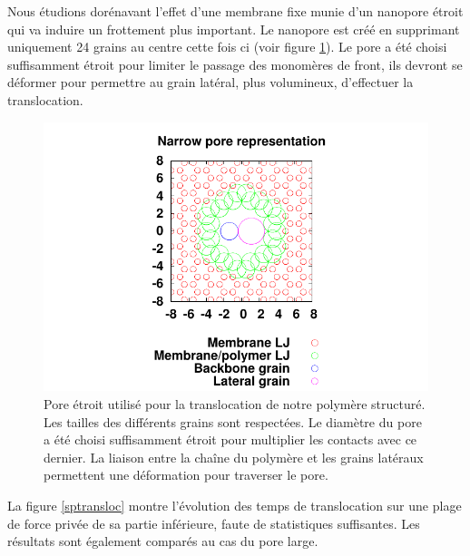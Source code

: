 Nous étudions dorénavant l'effet d'une membrane fixe munie d'un nanopore étroit qui va induire un frottement plus important. Le nanopore est créé en supprimant uniquement 24 grains au centre cette fois ci (voir figure \ref{porethin}). Le pore a été choisi suffisamment étroit pour limiter le passage des monomères de front, ils devront se déformer pour permettre au grain latéral, plus volumineux, d'effectuer la translocation.

\begin{figure}[H]
\begin{center}
\includegraphics[width=1\textwidth]{thinpore.pdf}


\caption[Polymère structuré et pore étroit]{Pore étroit utilisé pour la translocation de notre polymère structuré. Les tailles des différents grains sont respectées. Le diamètre du pore a été choisi suffisamment étroit pour multiplier les contacts avec ce dernier. La liaison entre la chaîne du polymère et les grains latéraux permettent une déformation pour traverser le pore.}
\label{porethin}

\end{center}
\end{figure}

La figure \ref{sptransloc} montre l'évolution des temps de translocation sur une plage de force privée de sa partie inférieure, faute de statistiques suffisantes. Les résultats sont également comparés au cas du pore large.

